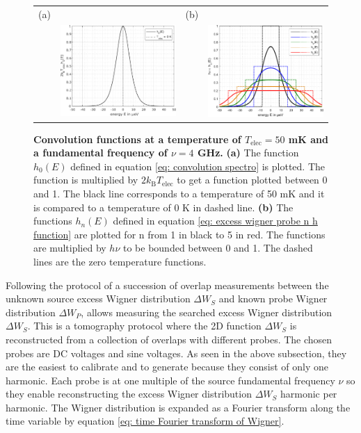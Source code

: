 \begin{figure}[hptb]
	\begin{center}
		\begin{tabular}{c c c c}
			(a) & & (b) &  \\ 
			
			& \includegraphics[width = 6cm]{./chap1/convolution_h_0} &
			& \includegraphics[width = 6cm]{./chap1/convolution_h_1_to_5}
		\end{tabular} 
	\end{center}
	\caption{\textbf{Convolution functions at a temperature of $T_{\mathrm{elec}} = 50$ mK and a fundamental frequency of $ \nu = 4$ GHz.} \textbf{(a)} The function $h_{0}\left(E\right)$ defined in equation \eqref{eq: convolution spectro} is plotted. The function is multiplied by $2k_{\mathrm{B}}T_{\mathrm{elec}}$ to get a function plotted between 0 and 1. The black line corresponds to a temperature of 50 mK and it is compared to a temperature of 0 K in dashed line. \textbf{(b)} The functions $h_{n}\left(E\right)$ defined in equation \eqref{eq: excess wigner probe n h function} are plotted for n from 1 in black to 5 in red. The functions are multiplied by $h\nu$ to be bounded between 0 and 1. The dashed lines are the zero temperature functions.}
	\label{fig: convolution function}
\end{figure}

Following the protocol of \cite{grenier2011single} a succession of overlap measurements between the unknown source excess Wigner distribution $\Delta W_{S}$ and known probe Wigner distribution $\Delta W_{P}$, allows measuring the searched excess Wigner distribution $\Delta W_{S}$.
This is a tomography protocol where the 2D function $\Delta W_{S}$ is reconstructed from a collection of overlaps with different probes.
The chosen probes are DC voltages and sine voltages.
As seen in the above subsection, they are the easiest to calibrate and to generate because they consist of only one harmonic.
Each probe is at one multiple of the source fundamental frequency $\nu$ so they enable reconstructing the excess Wigner distribution $\Delta W_{S}$ harmonic per harmonic.
The Wigner distribution is expanded as a Fourier transform along the time variable by equation \eqref{eq: time Fourier transform of Wigner}.

